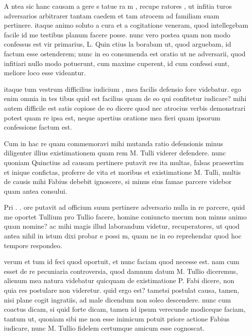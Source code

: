 
 A ntea sic hanc causam a gere s tatue ra m , recupe ratores , ut infitia turos adversarios arbitrarer tantam caedem et tam atrocem ad familiam suam pertinere. itaque animo soluto a cura et a cogitatione veneram, quod intellegebam facile id me testibus planum facere posse. nunc vero postea quam non modo confessus est vir primarius, L. Quin ctius la borabam ut, quod arguebam, id factum esse ostenderem; nunc in eo consumenda est oratio ut ne adversarii, quod infitiari nullo modo potuerunt, cum maxime cuperent, id cum confessi sunt, meliore loco esse videantur.

 itaque tum vestrum difficilius iudicium , mea facilis defensio fore videbatur. ego enim omnia in tes tibus quid est facilius quam de eo qui confitetur iudicare? mihi autem difficile est satis copiose de eo dicere quod nec atrocius verbis demonstrari potest quam re ipsa est, neque apertius oratione mea fieri quam ipsorum confessione factum est.

 Cum in hac re quam commemoravi mihi mutanda ratio defensionis minus diligenter illius existimationem quam rem M. Tulli viderer defendere. nunc quoniam Quinctius ad causam pertinere putavit res ita multas, falsas praesertim et inique confictas, proferre de vita et moribus et existimatione M. Tulli, multis de causis mihi Fabius debebit ignoscere, si minus eius famae parcere videbor quam antea consului.

 Pri . . ore putavit ad officium suum pertinere adversario nulla in re parcere, quid me oportet Tullium pro Tullio facere, homine coniuncto mecum non minus animo quam nomine? ac mihi magis illud laborandum videtur, recuperatores, ut quod antea nihil in istum dixi probar e possi m, quam ne in eo reprehendar quod hoc tempore respondeo.

 verum et tum id feci quod oportuit, et nunc faciam quod necesse est. nam cum esset de re pecuniaria controversia, quod damnum datum M. Tullio diceremus, alienum mea natura videbatur quicquam de existimatione P. Fabi dicere, non quia res postulare non videretur. quid ergo est? tametsi postulat causa, tamen, nisi plane cogit ingratiis, ad male dicendum non soleo descendere. nunc cum coactus dicam, si quid forte dicam, tamen id ipsum verecunde modiceque faciam, tantum ut, quoniam sibi me non esse inimicum potuit priore actione Fabius iudicare, nunc M. Tullio fidelem certumque amicum esse cognoscat.

